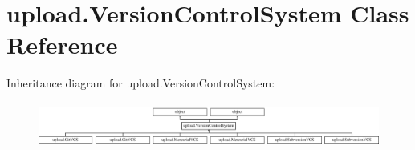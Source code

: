 \hypertarget{classupload_1_1VersionControlSystem}{}\section{upload.\+Version\+Control\+System Class Reference}
\label{classupload_1_1VersionControlSystem}
Inheritance diagram for upload.\+Version\+Control\+System\+:\begin{figure}[H]
\begin{center}
\leavevmode
\includegraphics[height=1.497326cm]{classupload_1_1VersionControlSystem}
\end{center}
\end{figure}
